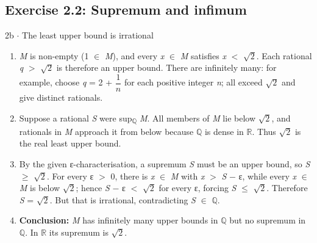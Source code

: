 \documentclass[11pt]{article}
\begin{document}
\begin{keepsection}\subsection{Exercise 2.2: Supremum and infimum}

\begin{workedbox}{2b \ensuremath{\cdot} The least upper bound is irrational}
\begin{enumerate}
\item \textit{M} is non-empty (1 \ensuremath{\in} \textit{M}), and every \textit{x} \ensuremath{\in} \textit{M} satisfies \textit{x} \ensuremath{<} \ensuremath{\sqrt{2}}. Each rational \textit{q} \ensuremath{>} \ensuremath{\sqrt{2}} is therefore an upper bound. There are infinitely many: for example, choose \textit{q} = 2 + {\small\ensuremath{\dfrac{1}{{n}}}} for each positive integer \textit{n}; all exceed \ensuremath{\sqrt{2}} and give distinct rationals.
\item Suppose a rational \textit{S} were sup\textsubscript{\ensuremath{\mathbb{Q}}} \textit{M}. All members of \textit{M} lie below \ensuremath{\sqrt{2}}, and rationals in \textit{M} approach it from below because \ensuremath{\mathbb{Q}} is dense in \ensuremath{\mathbb{R}}. Thus \ensuremath{\sqrt{2}} is the real least upper bound.
\item By the given ε-characterisation, a supremum \textit{S} must be an upper bound, so \textit{S} \ensuremath{\geq} \ensuremath{\sqrt{2}}. For every ε \ensuremath{>} 0, there is \textit{x} \ensuremath{\in} \textit{M} with \textit{x} \ensuremath{>} \textit{S} \ensuremath{-} ε, while every \textit{x} \ensuremath{\in} \textit{M} is below \ensuremath{\sqrt{2}}; hence \textit{S} \ensuremath{-} ε \ensuremath{<} \ensuremath{\sqrt{2}} for every ε, forcing \textit{S} \ensuremath{\leq} \ensuremath{\sqrt{2}}. Therefore \textit{S} = \ensuremath{\sqrt{2}}. But that is irrational, contradicting \textit{S} \ensuremath{\in} \ensuremath{\mathbb{Q}}.
\item \textbf{Conclusion:} \textit{M} has infinitely many upper bounds in \ensuremath{\mathbb{Q}} but no supremum in \ensuremath{\mathbb{Q}}. In \ensuremath{\mathbb{R}} its supremum is \ensuremath{\sqrt{2}}.
\end{enumerate}
\end{workedbox}

\end{keepsection}
\end{document}
